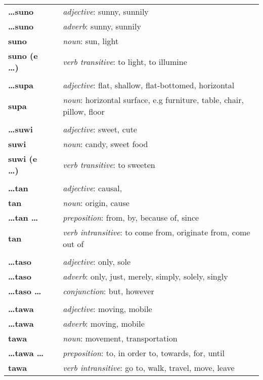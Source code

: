 \begin{supertabular}{p{2,5cm}|ll}
\textbf{\dots suno} && \textit{adjective}: sunny, sunnily \\ 
\textbf{\dots suno} && \textit{adverb}: sunny, sunnily \\ 
\textbf{suno} && \textit{noun}: sun, light \\ 
\textbf{suno (e \dots)} && \textit{verb transitive}: to light, to illumine \\ 
 && \\ %
 \textbf{\dots supa} && \textit{adjective}: flat, shallow, flat-bottomed, horizontal \\ 
\textbf{supa} && \textit{noun}: horizontal surface, e.g furniture, table, chair, pillow, floor \\ 
 && \\ %
\textbf{\dots suwi} && \textit{adjective}: sweet, cute \\ 
\textbf{suwi} && \textit{noun}: candy, sweet food \\ 
\textbf{suwi (e \dots)} && \textit{verb transitive}: to sweeten \\ 
 && \\ %
\textbf{\dots tan} && \textit{adjective}: causal, \\ 
\textbf{tan} && \textit{noun}: origin, cause \\ 
\textbf{\dots tan \dots} && \textit{preposition}: from, by, because of, since \\ 
\textbf{tan} && \textit{verb intransitive}: to come from, originate from, come out of \\ 
 && \\ %
\textbf{\dots taso} && \textit{adjective}: only, sole \\ 
\textbf{\dots taso} && \textit{adverb}: only, just, merely, simply, solely, singly \\ 
\textbf{\dots taso \dots} && \textit{conjunction}: but, however \\ 
 && \\ %
\textbf{\dots tawa} && \textit{adjective}: moving, mobile \\ 
\textbf{\dots tawa} && \textit{adverb}: moving, mobile \\ 
\textbf{tawa} && \textit{noun}: movement, transportation \\ 
\textbf{\dots tawa \dots} && \textit{preposition}: to, in order to, towards, for, until \\ 
\textbf{tawa} && \textit{verb intransitive}: go to, walk, travel, move, leave \\ 

\end{supertabular}
